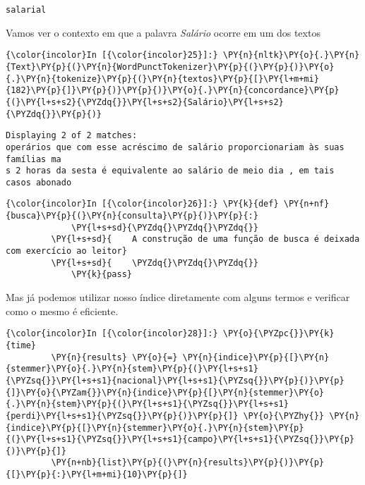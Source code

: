     \begin{Verbatim}[commandchars=\\\{\}]
salarial

    \end{Verbatim}

    Vamos ver o contexto em que a palavra \emph{Salário} ocorre em um dos
textos

    \begin{Verbatim}[commandchars=\\\{\}]
{\color{incolor}In [{\color{incolor}25}]:} \PY{n}{nltk}\PY{o}{.}\PY{n}{Text}\PY{p}{(}\PY{n}{WordPunctTokenizer}\PY{p}{(}\PY{p}{)}\PY{o}{.}\PY{n}{tokenize}\PY{p}{(}\PY{n}{textos}\PY{p}{[}\PY{l+m+mi}{182}\PY{p}{]}\PY{p}{)}\PY{p}{)}\PY{o}{.}\PY{n}{concordance}\PY{p}{(}\PY{l+s+s2}{\PYZdq{}}\PY{l+s+s2}{Salário}\PY{l+s+s2}{\PYZdq{}}\PY{p}{)}
\end{Verbatim}

    \begin{Verbatim}[commandchars=\\\{\}]
Displaying 2 of 2 matches:
operários que com esse acréscimo de salário proporcionariam às suas famílias ma
s 2 horas da sesta é equivalente ao salário de meio dia , em tais casos abonado

    \end{Verbatim}

    \begin{Verbatim}[commandchars=\\\{\}]
{\color{incolor}In [{\color{incolor}26}]:} \PY{k}{def} \PY{n+nf}{busca}\PY{p}{(}\PY{n}{consulta}\PY{p}{)}\PY{p}{:}
             \PY{l+s+sd}{\PYZdq{}\PYZdq{}\PYZdq{}}
         \PY{l+s+sd}{    A construção de uma função de busca é deixada com exercício ao leitor}
         \PY{l+s+sd}{    \PYZdq{}\PYZdq{}\PYZdq{}}
             \PY{k}{pass}
\end{Verbatim}

    Mas já podemos utilizar nosso índice diretamente com alguns termos e
verificar como o mesmo é eficiente.

    \begin{Verbatim}[commandchars=\\\{\}]
{\color{incolor}In [{\color{incolor}28}]:} \PY{o}{\PYZpc{}}\PY{k}{time}
         \PY{n}{results} \PY{o}{=} \PY{n}{indice}\PY{p}{[}\PY{n}{stemmer}\PY{o}{.}\PY{n}{stem}\PY{p}{(}\PY{l+s+s1}{\PYZsq{}}\PY{l+s+s1}{nacional}\PY{l+s+s1}{\PYZsq{}}\PY{p}{)}\PY{p}{]}\PY{o}{\PYZam{}}\PY{n}{indice}\PY{p}{[}\PY{n}{stemmer}\PY{o}{.}\PY{n}{stem}\PY{p}{(}\PY{l+s+s1}{\PYZsq{}}\PY{l+s+s1}{perdi}\PY{l+s+s1}{\PYZsq{}}\PY{p}{)}\PY{p}{]} \PY{o}{\PYZhy{}} \PY{n}{indice}\PY{p}{[}\PY{n}{stemmer}\PY{o}{.}\PY{n}{stem}\PY{p}{(}\PY{l+s+s1}{\PYZsq{}}\PY{l+s+s1}{campo}\PY{l+s+s1}{\PYZsq{}}\PY{p}{)}\PY{p}{]}
         \PY{n+nb}{list}\PY{p}{(}\PY{n}{results}\PY{p}{)}\PY{p}{[}\PY{p}{:}\PY{l+m+mi}{10}\PY{p}{]}
\end{Verbatim}

